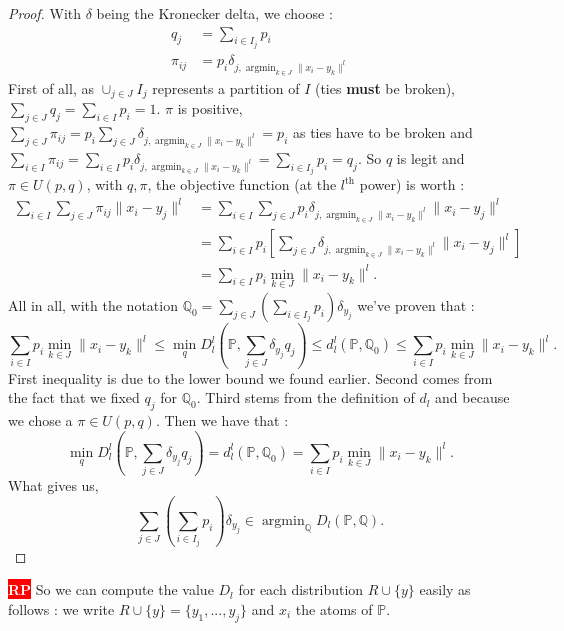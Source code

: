 \documentclass{amsart}
\newcommand{\argmin}{\mathop{\arg\min}}
\newcommand{\nb}[3]{
		{\colorbox{#2}{\bfseries\sffamily\tiny\textcolor{white}{#1}}}
		{\textcolor{#2}{\text{$\blacktriangleright$}{\textcolor{#2}{#3}}\text{$\blacktriangleleft$}}}}
\newcommand{\rp}[1]{\nb{RP}{red}{#1}}
\begin{document}
\begin{proof}
With $\delta$ being the Kronecker delta, we choose : \begin{align*}
    q_j&=\sum_{i\in I_j}p_i \\
    \pi_{ij}&=p_i\delta_{j,\argmin_{k\in J}\lVert x_i-y_k\rVert^l}
\end{align*}
First of all, as $\cup_{j\in J}I_j$ represents a partition of $I$ (ties \textbf{must} be broken), $\sum_{j\in J}q_j=\sum_{i\in I}p_i=1$.\newline
$\pi$ is positive, $\sum_{j\in J}\pi_{ij}=p_i\sum_{j\in J}\delta_{j,\argmin_{k\in J}\lVert x_i-y_k\rVert^l}=p_i$ as ties have to be broken and \newline $\sum_{i\in I}\pi_{ij}=\sum_{i\in I}p_i\delta_{j,\argmin_{k\in J}\lVert x_i-y_k\rVert^l}=\sum_{i\in I_j}p_i=q_j$. So $q$ is legit and $\pi\in U\left(p,q\right)$, with $q,\pi$, the objective function (at the $l^{\text{th}}$ power) is worth : 
\begin{align*}
    \sum_{i\in I}\sum_{j\in J}\pi_{ij}\lVert x_i-y_j\rVert^l &=\sum_{i\in I}\sum_{j\in J}p_i\delta_{j, \argmin_{k\in J}\lVert x_i-y_k\rVert^l}\lVert x_i-y_j\rVert^l \\ &=\sum_{i\in I}p_i\left[\sum_{j\in J}\delta_{j, \argmin_{k\in J}\lVert x_i-y_k\rVert^l}\lVert x_i-y_j\rVert^l\right] \\ &=\sum_{i\in I}p_i\min_{k\in J}\lVert x_i-y_k\rVert ^l.
\end{align*}
All in all, with the notation $\mathbb{Q}_0=\sum_{j\in J}\left(\sum_{i\in I_j}p_i\right)\delta_{y_j}$ we've proven that :
$$
\sum_{i\in I}p_i\min_{k\in J}\lVert x_i-y_k\rVert ^l\leq \min_{q} D_l^l\left(\mathbb{P},\sum_{j\in J}\delta_{y_j}q_j\right)\leq d_l^l\left(\mathbb{P},\mathbb{Q}_0\right) \leq \sum_{i\in I}p_i\min_{k\in J}\lVert x_i-y_k\rVert ^l.
$$
First inequality is due to the lower bound we found earlier. Second comes from the fact that we fixed $q_j$ for $\mathbb{Q}_0$. Third stems from the definition of $d_l$ and because we chose a $\pi\in U\left(p,q\right)$. Then we have that :
$$
\min_{q} D_l^l\left(\mathbb{P},\sum_{j\in J}\delta_{y_j}q_j\right)= d_l^l\left(\mathbb{P},\mathbb{Q}_0\right)= \sum_{i\in I}p_i\min_{k\in J}\lVert x_i-y_k\rVert ^l.
$$
What gives us,
$$\sum_{j\in J}\left(\sum_{i\in I_j}p_i\right)\delta_{y_j}\in \argmin_\mathbb{Q} D_l\left(\mathbb{P},\mathbb{Q}\right).$$
\end{proof}
\rp{what do you think of this proof ? i gave it all}
So we can compute the value $D_l$ for each distribution $R\cup\{y\}$ easily as follows : we write $R\cup \{y\}=\{y_1,...,y_j\}$ and $x_i$ the atoms of $\mathbb{P}$.
\end{document}
